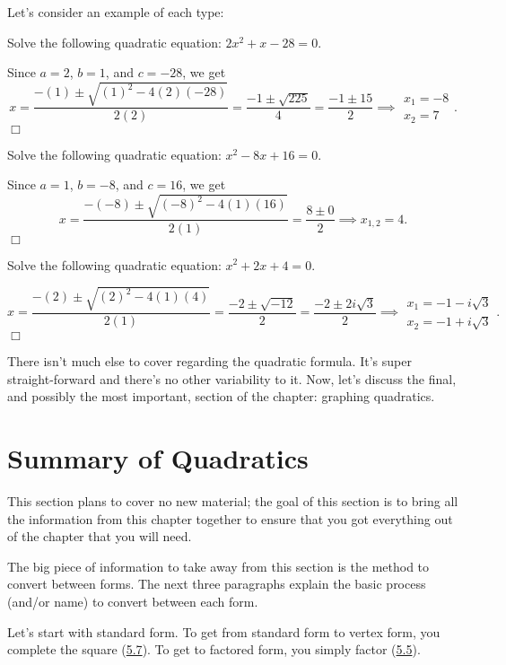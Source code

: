 \documentclass[../book.tex]{subfiles}
\begin{document}
Let's consider an example of each type:
\begin{example}
Solve the following quadratic equation: $2x^2+x-28=0$.
\end{example}
\begin{solution}
Since $a=2$, $b=1$, and $c=-28$, we get $$x=\frac{-(1)\pm\sqrt{(1)^2-4(2)(-28)}}{2(2)}=\frac{-1\pm\sqrt{225}}{4}=\frac{-1\pm 15}{2}\implies \begin{matrix} x_1=-8 \\ x_2=7 \end{matrix}.$$$\Box$
\end{solution}
\begin{example}
Solve the following quadratic equation: $x^2-8x+16=0$.
\end{example}
\begin{solution}
Since $a=1$, $b=-8$, and $c=16$, we get $$x=\frac{-(-8)\pm\sqrt{(-8)^2-4(1)(16)}}{2(1)}=\frac{8\pm 0}{2} \implies x_{1,2}=4.$$ $\Box$
\end{solution}
\begin{example}
Solve the following quadratic equation: $x^2+2x+4=0$.
\end{example}
\begin{solution}
$$x=\frac{-(2)\pm\sqrt{(2)^2-4(1)(4)}}{2(1)}=\frac{-2\pm\sqrt{-12}}{2}=\frac{-2\pm 2i\sqrt{3}}{2} \implies \begin{matrix} x_1=-1-i\sqrt{3} \\ x_2=-1+i\sqrt{3} \end{matrix}.$$ $\Box$
\end{solution}
\noindent There isn't much else to cover regarding the quadratic formula.  It's super straight-forward and there's no other variability to it.  Now, let's discuss the final, and possibly the most important, section of the chapter: graphing quadratics.
\section{Summary of Quadratics}
This section plans to cover no new material; the goal of this section is to bring all the information from this chapter together to ensure that you got everything out of the chapter that you will need.

The big piece of information to take away from this section is the method to convert between forms.  The next three paragraphs explain the basic process (and/or name) to convert between each form.

Let's start with standard form.  To get from standard form to vertex form, you complete the square (\hyperlink{section.5.7}{5.7}).  To get to factored form, you simply factor (\hyperlink{section.5.5}{5.5}).
\end{document}
